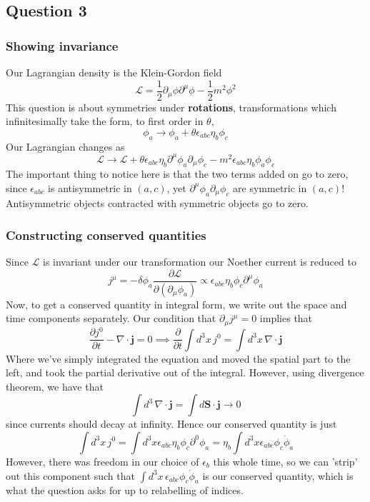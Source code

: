 \subsection{Question 3}

\subsubsection*{Showing invariance}
Our Lagrangian density is the Klein-Gordon field 
\[ 
\mathcal{L}  = \frac{1}{ 2} \partial_\mu \phi \partial^\mu \phi  - \frac{1}{2} m^2 \phi^2 \] 
This question is about symmetries under \textbf{rotations}, transformations which infinitesimally take the form, to first order in $\theta$,  
\[ 
\phi_a \rightarrow \phi_a + \theta \epsilon_{abc} \eta_b \phi_c 
\] 
Our Lagrangian changes as 
\[ 
\mathcal{L } \rightarrow \mathcal{L} + \theta \epsilon_{abc} \eta_b \partial^\mu \phi_a \partial_\mu \phi_c - m^2 \epsilon_{abc} \eta_b \phi_a \phi_c 
\] 
The important thing to notice here is that the two terms added on go to zero, since $\epsilon_{abc} $ is antisymmetric in $(a, c)$, yet $\partial^\mu \phi_a \partial_\mu \phi_c$ are symmetric in $(a, c)$! Antisymmetric objects contracted with symmetric objects go to zero. 

\subsubsection*{Constructing conserved quantities}
Since $\mathcal{L } $ is invariant under our transformation our Noether current is reduced to \[ j^\mu =  - \delta \phi_a \frac{ \partial \mathcal{L} }{ \partial ( \partial_\mu \phi_ a) }  \propto \epsilon_{ abc} \eta_b \phi_c \partial^\mu \phi_a \] 
Now, to get a conserved quantity in integral form, we write out the space and time components separately. Our condition that $\partial_\mu j^\mu = 0 $ implies that 
\[ 
\frac{\partial j^0}{ \partial t}  - \nabla \cdot \mathbf{j}  = 0 \implies \frac{ \partial }{ \partial t} \int d^3 x \, j^0 = \int d^3 x \, \nabla \cdot \mathbf{ j } \] 
Where we've simply integrated the equation and moved the spatial part to the left, and took the partial derivative out of the integral. However, using divergence theorem, we have that 
\[ \int d^3 \, \nabla \cdot \mathbf{ j}  = \int d \mathbf{ S} \cdot \mathbf{j} \rightarrow 0 \] since currents should decay at infinity. Hence our conserved quantity is just 
\[ 	
\int d^3 x \, j^0  = \int d^3 x \epsilon_{ abc} \eta_b \phi_c \partial^0 \phi_a  = \eta_b \int d^3 x \epsilon_{abc} \phi_c \dot{ \phi}_a \] 
However, there was freedom in our choice of $\epsilon_b$ this whole time, so we can 'strip' out this component such that $\int d^3 x \, \epsilon_{ abc} \phi_c \dot{\phi}_a$ is our conserved quantity, which is what the question asks for up to relabelling of indices. 

